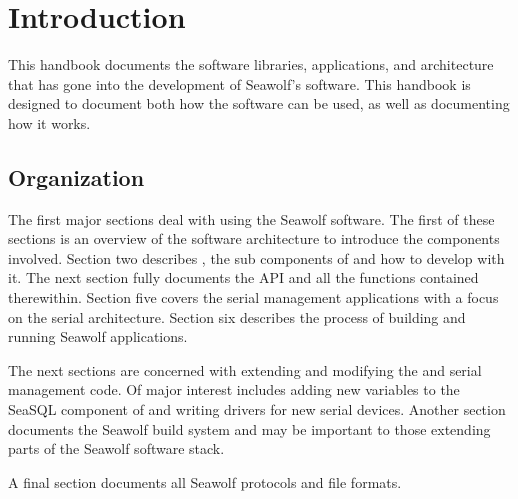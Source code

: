 
\newpage
\section {Introduction} \label{introduction}
This handbook documents the software libraries, applications, and architecture
that has gone into the development of Seawolf's software. This handbook is
designed to document both how the software can be used, as well as documenting
how it works. 

\subsection {Organization} \label {introorganization}
The first major sections deal with using the Seawolf software. The first of
these sections is an overview of the software architecture to introduce the
components involved. Section two describes \libseawolf{}, the sub components of
\libseawolf{} and how to develop with it. The next section fully documents the
\libseawolf{} API and all the functions contained therewithin. Section five
covers the serial management applications with a focus on the serial
architecture. Section six describes the process of building and running Seawolf
applications.

The next sections are concerned with extending and modifying the \libseawolf{}
and serial management code. Of major interest includes adding new variables to
the SeaSQL component of \libseawolf{} and writing drivers for new serial
devices. Another section documents the Seawolf build system and may be important
to those extending parts of the Seawolf software stack.

A final section documents all Seawolf protocols and file formats. 
